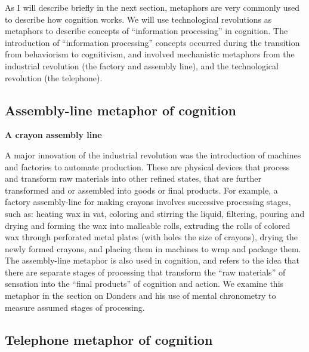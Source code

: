 \documentclass[
  oneside,
  12pt]{crumpbook}
\newenvironment{floatright50}{%
  \wrapfigure{R}{.5\textwidth}%
  }{%
  \endwrapfigure}
\begin{document}
As I will describe briefly in the next section, metaphors are very commonly used to describe how cognition works. We will use technological revolutions as metaphors to describe concepts of ``information processing'' in cognition. The introduction of ``information processing'' concepts occurred during the transition from behaviorism to cognitivism, and involved mechanistic metaphors from the industrial revolution (the factory and assembly line), and the technological revolution (the telephone).

\hypertarget{assembly-line-metaphor-of-cognition}{%
\subsection{Assembly-line metaphor of cognition}\label{assembly-line-metaphor-of-cognition}}

\begin{floatright50}

\textbf{A crayon assembly line}

\end{floatright50}

A major innovation of the industrial revolution was the introduction of machines and factories to automate production. These are physical devices that process and transform raw materials into other refined states, that are further transformed and or assembled into goods or final products. For example, a factory assembly-line for making crayons involves successive processing stages, such as: heating wax in vat, coloring and stirring the liquid, filtering, pouring and drying and forming the wax into malleable rolls, extruding the rolls of colored wax through perforated metal plates (with holes the size of crayons), drying the newly formed crayons, and placing them in machines to wrap and package them. The assembly-line metaphor is also used in cognition, and refers to the idea that there are separate stages of processing that transform the ``raw materials'' of sensation into the ``final products'' of cognition and action. We examine this metaphor in the section on Donders and his use of mental chronometry to measure assumed stages of processing.

\hypertarget{telephone-metaphor-of-cognition}{%
\subsection{Telephone metaphor of cognition}\label{telephone-metaphor-of-cognition}}
\end{document}
